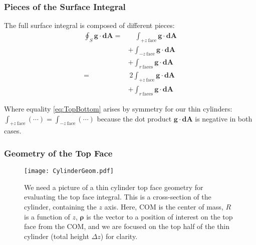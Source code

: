 \documentclass[aspectratio=43,serif,9pt]{beamer}
\newcommand{\vect}[1]{\boldsymbol{#1}}
\begin{document}
\begin{frame}
  \frametitle{Pieces of the Surface Integral}

  The full surface integral is composed of different pieces:
  \begin{subequations}
  \begin{align}
    \oint_{S} \vect{g} \cdot  \vect{dA} = &\quad \int_{+z~\mathrm{face}} \vect{g} \cdot  \vect{dA} \\
                                          &+ \int_{-z~\mathrm{face}} \vect{g} \cdot  \vect{dA} \nonumber \\
                                          &+ \int_{r~\mathrm{faces}} \vect{g} \cdot  \vect{dA} \nonumber \\
    = &~2\int_{+z~\mathrm{face}} \vect{g} \cdot  \vect{dA}  \label{eq:TopBottom} \\
    &+ \int_{r~\mathrm{faces}} \vect{g} \cdot  \vect{dA} \nonumber
  \end{align}
  \end{subequations}


  Where equality \eqref{eq:TopBottom} arises by symmetry for our thin cylinders: $\int_{+z~\mathrm{face}}(\cdots) = \int_{-z~\mathrm{face}}(\cdots)$ because the dot product $\vect{g} \cdot \vect{dA}$ is negative in both cases.
\end{frame}

\begin{frame}
  \frametitle{Geometry of the Top Face}


  \begin{figure}[h!]
  \texttt{[image: CylinderGeom.pdf]}
    \caption{We need a picture of a thin cylinder top face geometry for evaluating the top face integral. This is a cross-section of the cylinder, containing the $z$ axis. Here, COM is the center of mass, $R$ is a function of $z$, $\vect{\rho}$ is the vector to a position of interest on the top face from the COM, and we are focused on the top half of the thin cylinder (total height $\Delta z$) for clarity.
}
  \label{fig:TopFaceGeom}
\end{figure}



\end{frame}
\end{document}
